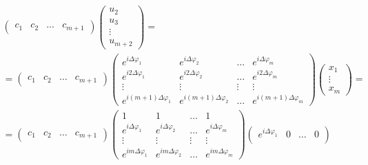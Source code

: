 \begin{multline*}
    \begin{pmatrix}
        c_1 & c_2 & \dots & c_{m+1}
    \end{pmatrix}
    \begin{pmatrix}
        u_2    \\
        u_3    \\
        \vdots \\
        u_{m+2}
    \end{pmatrix} = \\
    = \begin{pmatrix}
        c_1 & c_2 & \dots & c_{m+1}
    \end{pmatrix}
    \begin{pmatrix}
        e^{i \Delta \varphi_1}       & e^{i \Delta \varphi_2}       & \dots  & e^{i \Delta \varphi_m}       \\
        e^{i 2 \Delta \varphi_1}     & e^{i 2 \Delta \varphi_2}     & \dots  & e^{i 2 \Delta \varphi_m}     \\
        \vdots                       & \vdots                       & \vdots & \vdots                       \\
        e^{i (m+1) \Delta \varphi_1} & e^{i (m+1) \Delta \varphi_2} & \dots  & e^{i (m+1) \Delta \varphi_m}
    \end{pmatrix}
    \begin{pmatrix}
        x_1    \\
        \vdots \\
        x_m
    \end{pmatrix} = \\
    = \begin{pmatrix}
        c_1 & c_2 & \dots & c_{m+1}
    \end{pmatrix}
    \begin{pmatrix}
        1                        & 1                        & \dots  & 1                        \\
        e^{i \Delta \varphi_1}   & e^{i \Delta \varphi_2}   & \dots  & e^{i \Delta \varphi_m}   \\
        \vdots                   & \vdots                   & \vdots & \vdots                   \\
        e^{i m \Delta \varphi_1} & e^{i m \Delta \varphi_2} & \dots  & e^{i m \Delta \varphi_m}
    \end{pmatrix}
    \begin{pmatrix}
        e^{i \Delta \varphi_1} & 0                      & \dots  & 0                      \\

\end{pmatrix}
\end{multline*}

